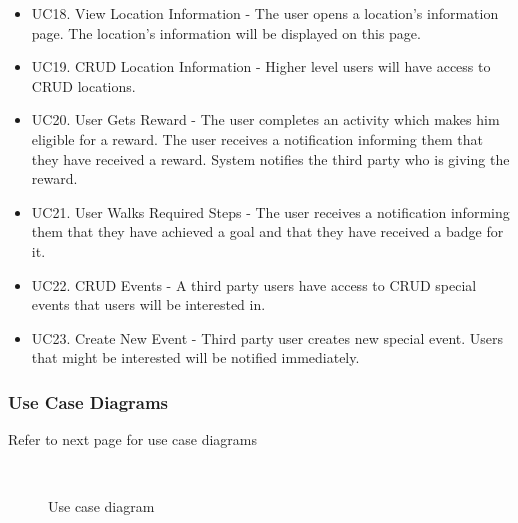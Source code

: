 \documentclass[11pt]{article}
\begin{document}
\begin{itemize}
	\item UC18. View Location Information - The user opens a location’s information page. The location’s information will be displayed on this page.
	\item UC19. CRUD Location Information - Higher level users will have access to CRUD locations.
	\item UC20. User Gets Reward - The user completes an activity which makes him eligible for a reward. The user receives a notification informing them that they have received a reward. System notifies the third party who is giving the reward.
	\item UC21. User Walks Required Steps - The user receives a notification informing them that they have achieved a goal and that they have received a badge for it.
	\item UC22. CRUD Events - A third party users have access to CRUD special events that users will be interested in.
	\item UC23. Create New Event - Third party user creates new special event. Users that might be interested will be notified immediately.
	\end{itemize}
	
	\subsubsection{Use Case Diagrams}
	Refer to next page for use case diagrams
	\begin{figure}[p]
	    \vspace*{-2.7cm}
	    \centering
	    \\[2cm]
	    \caption{Use case diagram}
	\end{figure} 
	
\end{document}
